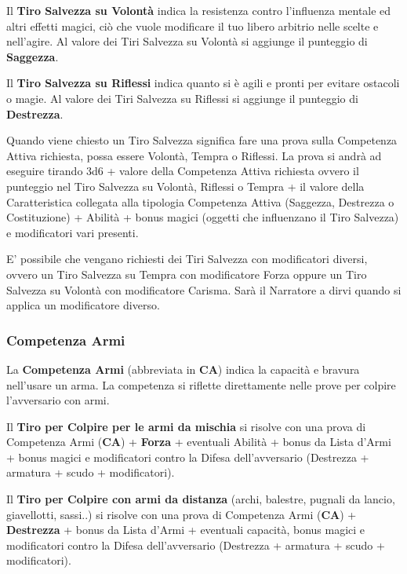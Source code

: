 \begin{multicols}{2}
Il \textbf{Tiro Salvezza su Volontà} indica la resistenza contro l'influenza mentale ed altri effetti magici, ciò che vuole modificare il tuo libero arbitrio nelle scelte e nell'agire. Al valore dei Tiri Salvezza su Volontà si aggiunge il punteggio di \textbf{Saggezza}.

Il \textbf{Tiro Salvezza su Riflessi} indica quanto si è agili e pronti per evitare ostacoli o magie. Al valore dei Tiri Salvezza su Riflessi si aggiunge il punteggio di \textbf{Destrezza}.

Quando viene chiesto un Tiro Salvezza significa fare una prova sulla Competenza Attiva richiesta, possa essere Volontà, Tempra o Riflessi.
La prova si andrà ad eseguire tirando 3d6 + valore della Competenza Attiva richiesta ovvero il punteggio nel Tiro Salvezza su Volontà, Riflessi o Tempra + il valore della Caratteristica collegata alla tipologia Competenza Attiva (Saggezza, Destrezza o Costituzione) + Abilità + bonus magici (oggetti che influenzano il Tiro Salvezza) e modificatori vari presenti.

\medskip

\begin{changemargin}{0.3cm}{0.3cm}\begin{tcolorbox}[title = Tiri Salvezza non standard]
E' possibile che vengano richiesti dei Tiri Salvezza con modificatori diversi, ovvero un Tiro Salvezza su Tempra con modificatore Forza oppure un Tiro Salvezza su Volontà con modificatore Carisma. Sarà il Narratore a dirvi quando si applica un modificatore diverso.
\end{tcolorbox}\end{changemargin}

\subsubsection{Competenza Armi}\label{competenzaarmi}

La \textbf{Competenza Armi} (abbreviata in \textbf{CA}) indica la capacità e bravura nell'usare un arma. La competenza si riflette direttamente nelle prove per colpire l'avversario con armi.

Il \textbf{Tiro per Colpire per le armi da mischia} si risolve con una prova di Competenza Armi (\textbf{CA}) + \textbf{Forza} + eventuali Abilità + bonus da Lista d'Armi + bonus magici e modificatori contro la Difesa dell'avversario (Destrezza + armatura + scudo + modificatori).

Il \textbf{Tiro per Colpire con armi da distanza} (archi, balestre, pugnali da lancio, giavellotti, sassi..) si risolve con una prova di Competenza Armi (\textbf{CA}) + \textbf{Destrezza} + bonus da Lista d'Armi + eventuali capacità, bonus magici e modificatori contro la Difesa dell'avversario (Destrezza + armatura + scudo + modificatori).


\end{multicols}
